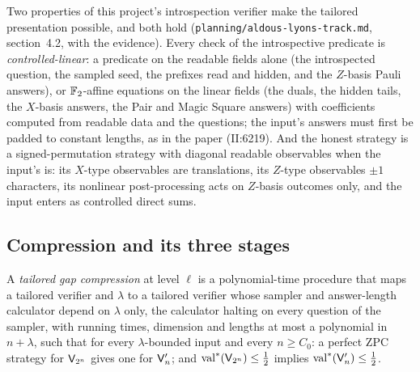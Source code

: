 \begin{remark}
\label{rem:tailored-route-a}
Two properties of this project's introspection verifier make the tailored presentation
possible, and both hold (\texttt{planning/aldous-lyons-track.md}, section~4.2, with the evidence).
Every check of the introspective predicate is \emph{controlled-linear}: a predicate on the
readable fields alone (the introspected question, the sampled seed, the prefixes read and
hidden, and the $Z$-basis Pauli answers), or $\mathbb{F}_2$-affine equations on the linear fields (the
duals, the hidden tails, the $X$-basis answers, the Pair and Magic Square answers) with
coefficients computed from readable data and the questions; the input's answers must first be
padded to constant lengths, as in the paper (II:6219). And the honest strategy is a
signed-permutation strategy with diagonal readable observables when the input's is: its
$X$-type observables are translations, its $Z$-type observables $\pm 1$ characters, its
nonlinear post-processing acts on $Z$-basis outcomes only, and the input enters as controlled
direct sums.
\end{remark}

\subsection{Compression and its three stages}

\begin{definition}
\label{def:tailored-compression}
\leanok
A \emph{tailored gap compression} at level $\ell$ is a polynomial-time procedure that maps a
tailored verifier and $\lambda$ to a tailored verifier whose sampler and answer-length
calculator depend on $\lambda$ only, the calculator halting on every question of the sampler,
with running times, dimension and lengths at most a polynomial in $n + \lambda$, such that for
every $\lambda$-bounded input and every $n \geq C_0$: a perfect ZPC strategy for
$\mathsf{V}_{2^n}$ gives one for $\mathsf{V}'_n$; and $\mathrm{val}^*(\mathsf{V}_{2^n}) \leq \frac12$
implies $\mathrm{val}^*(\mathsf{V}'_n) \leq \frac12$.
\end{definition}

